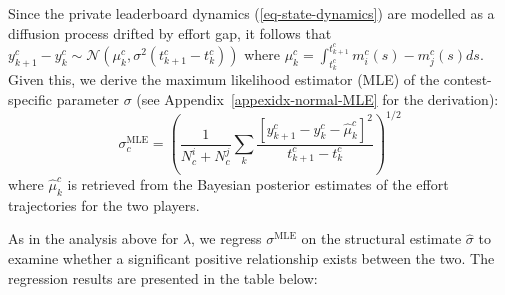 \documentclass[mnsc]{informs3}
\begin{document}
Since the private leaderboard dynamics (\ref{eq-state-dynamics}) are modelled as a diffusion process drifted by effort gap, it follows that $y^c_{k+1} - y^c_{k} \sim \mathcal{N}\left(\mu^c_k, \sigma^2(t^c_{k+1}-t^c_k)\right)$ where $\mu^c_k = \int^{t^c_{k+1}}_{t^c_k}m^c_i(s) - m^c_j(s)ds$. 
Given this, we derive the maximum likelihood estimator (MLE) of the contest-specific parameter $\sigma$ (see Appendix~\ref{appexidx-normal-MLE} for the derivation): 
\begin{equation*}
\sigma^{\text{MLE}}_c = \left(\frac{1}{N^i_c+N^j_c}\sum_k\frac{\left[y^c_{k+1}-y^c_{k}-\hat\mu^c_k\right]^2}{t^c_{k+1}-t^c_k}\right)^{1/2}
\end{equation*}
where $\hat\mu^c_k$ is retrieved from the Bayesian posterior estimates of the effort trajectories for the two players.

As in the analysis above for $\lambda$, we regress $\sigma^{\text{MLE}}$ on the structural estimate $\hat{\sigma}$ to examine whether a significant positive relationship exists between the two. 
The regression results are presented in the table below:
\end{document}
